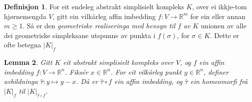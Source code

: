 \documentclass[a4paper, 12pt, norsk]{article}
\theoremstyle{plain}
\newtheorem{theorem}{Teorem}[section]
\newtheorem{lemma}[theorem]{Lemma}
\theoremstyle{definition}
\newtheorem{definition}[theorem]{Definisjon}
\newcommand{\Rb}{\mathbb{R}}
\newcommand{\gr}[1]{ \lvert #1 \rvert } %
\begin{document}
\begin{definition}
	For eit endeleg abstrakt simplisielt kompleks $K$, over ei ikkje-tom hjørnemengda $V$, gitt ein vilkårleg affin imbedding $f:V\to\Rb^m$ for ein eller annan $m\geq1$. Så er den \emph{geometriske realiseringa med hensyn til $f$ av \( K \)} unionen av alle dei geometriske simpleksane utspunne av punkta i $f(\sigma)$, for $\sigma\in K$. Dette er ofte betegna $\gr{K}_f$
\end{definition}


\begin{lemma} \label{thm:tau-homeomorfi}
	Gitt \( K \) eit abstrakt simplisielt kompleks over \( V \), og \( f \) ein affin imbedding \( f: V \to \Rb^n \). Fiksér \( x \in \Rb^n \). For eit vilkårleg punkt \( y \in \Rb^n \), definer avbildninga \( \hat{\tau}: y \mapsto y-x \). Då er \( \hat{\tau} \circ f \) ein affin imbedding, og \( \hat{\tau} \) ein homeomorfi frå \( \gr{K}_f \) til \( \gr{K}_{\hat{\tau} \circ f} \).
\end{lemma}
\end{document}

